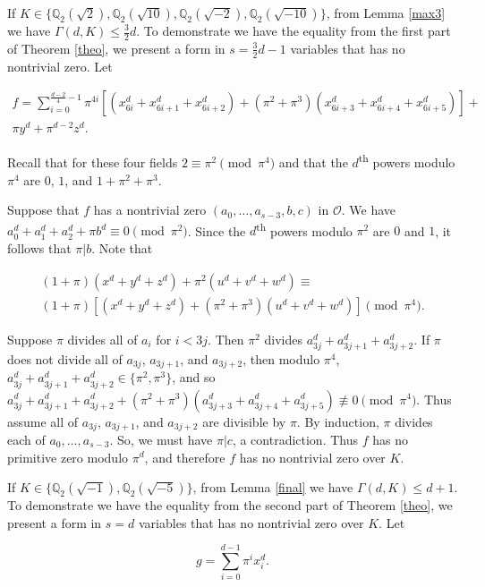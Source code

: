 \documentclass[12pt]{amsart}
\begin{document}
If $K \in \{\mathbb{Q}_2(\sqrt{2}), \mathbb{Q}_2(\sqrt{10}), \mathbb{Q}_2(\sqrt{-2}), \mathbb{Q}_2(\sqrt{-10})\}$, from Lemma \ref{max3} we have $\Gamma(d, K) \le \frac{3}{2}d$.  To demonstrate we have the equality from the first part of Theorem \ref{theo}, we present a form in $s = \frac{3}{2}d - 1$ variables that has no nontrivial zero.  Let

\begin{align*}
f = \sum_{i=0}^{\frac{d-2}{4} - 1} \pi^{4i}[(x_{6i}^d + x_{6i+1}^d + x_{6i+2}^d) + (\pi^2+\pi^3)(x_{6i+3}^d + x_{6i+4}^d + x_{6i+5}^d)] + \\
\pi y^d + \pi^{d-2}z^d.
\end{align*}

Recall that for these four fields $2 \equiv \pi^2 \pmod{\pi^4}$ and that the $d$\textsuperscript{th} powers modulo $\pi^4$ are $0$, $1$, and $1 + \pi^2 + \pi^3$.

Suppose that $f$ has a nontrivial zero $(a_0, \ldots, a_{s-3}, b, c)$ in $\mathcal{O}$.  We have $a_0^d + a_1^d + a_2^d + \pi b^d \equiv 0 \pmod{\pi^2}$.  Since the $d$\textsuperscript{th} powers modulo $\pi^2$ are $0$ and $1$, it follows that $\pi | b$.  Note that

\begin{align*}
    (1 + \pi)(x^d + y^d + z^d) + \pi^2(u^d + v^d + w^d) \equiv \\
    (1 + \pi)[(x^d + y^d + z^d) + (\pi^2 + \pi^3)(u^d + v^d + w^d)] \pmod{\pi^4}.
\end{align*}

Suppose $\pi$ divides all of $a_i$ for $i < 3j$.  Then $\pi^2$ divides $a_{3j}^d + a_{3j+1}^d + a_{3j+2}^d$.  If $\pi$ does not divide all of $a_{3j}$, $a_{3j+1}$, and $a_{3j+2}$, then modulo $\pi^4$, $a_{3j}^d + a_{3j+1}^d + a_{3j+2}^d \in \{\pi^2, \pi^3\}$, and so $a_{3j}^d + a_{3j+1}^d + a_{3j+2}^d + (\pi^2 + \pi^3)(a_{3j+3}^d + a_{3j+4}^d + a_{3j+5}^d) \not \equiv 0 \pmod{\pi^4}$.  Thus assume all of $a_{3j}$, $a_{3j+1}$, and $a_{3j+2}$ are divisible by $\pi$.  By induction, $\pi$ divides each of $a_0, \ldots, a_{s-3}$.  So, we must have $\pi | c$, a contradiction.  Thus $f$ has no primitive zero modulo $\pi^d$, and therefore $f$ has no nontrivial zero over $K$.

If $K \in \{\mathbb{Q}_2(\sqrt{-1}), \mathbb{Q}_2(\sqrt{-5})\}$, from Lemma \ref{final} we have $\Gamma(d, K) \le d+1$.  To demonstrate we have the equality from the second part of Theorem \ref{theo}, we present a form in $s = d$ variables that has no nontrivial zero over $K$.  Let

$$g = \sum_{i=0}^{d-1} \pi^i x_i^d.$$



\end{document}
